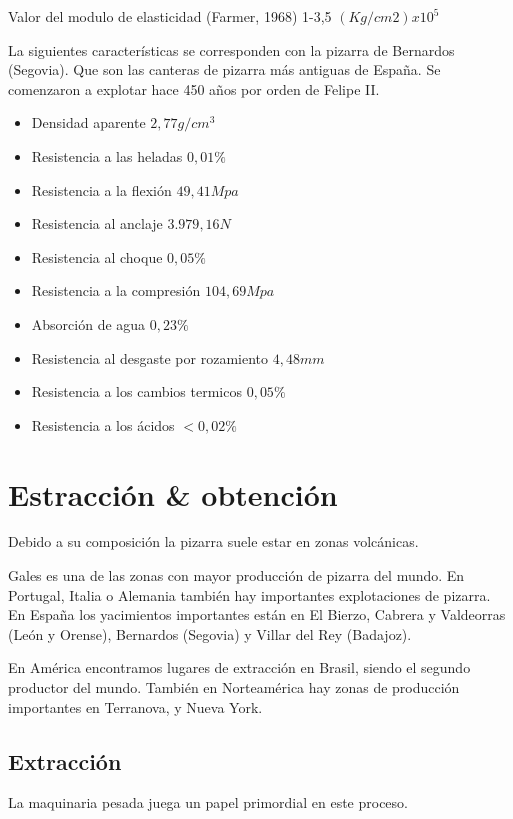 Valor del modulo de elasticidad (Farmer, 1968) 1-3,5 $(Kg/cm2) x 10^5$
\par
La siguientes características se corresponden con la pizarra de Bernardos (Segovia). Que son las canteras de pizarra más antiguas de España. Se comenzaron a explotar hace 450 años por orden de Felipe II.

 \begin{itemize}
        \item Densidad aparente $2,77 g/cm^3$ 
	\item Resistencia a las heladas $0,01\%$
	\item Resistencia a la flexión $49,41 Mpa$
	\item Resistencia al anclaje $3.979,16 N$
	\item Resistencia al choque $0,05\%$
	\item Resistencia a la compresión $104,69 Mpa$
	\item Absorción de agua $0,23\%$
	\item Resistencia al desgaste por rozamiento $4,48 mm$
	\item Resistencia a los cambios termicos $0,05\%$
	\item Resistencia a los ácidos $<0,02\%$
   \end{itemize}

\clearpage

\section {Estracción & obtención}
Debido a su composición la pizarra suele estar en zonas volcánicas.

Gales es una de las zonas con mayor producción de pizarra del mundo. En Portugal, Italia o Alemania también hay importantes explotaciones de pizarra. En España los yacimientos importantes están en El Bierzo,
Cabrera y Valdeorras (León y Orense), Bernardos (Segovia) y Villar del Rey (Badajoz).

En América encontramos lugares de extracción en Brasil, siendo el segundo productor del mundo. También en Norteamérica hay zonas de producción importantes en Terranova, y Nueva York.

	\subsection {Extracción}

La maquinaria pesada juega un papel primordial en este proceso.

